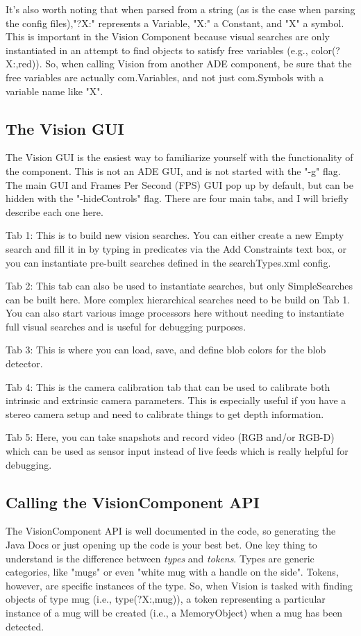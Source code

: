 \documentclass{article}
\begin{document}
It's also worth noting that when parsed from a string (as is the case when parsing
the config files),"?X:" represents a Variable, "X:" a Constant, and "X" a symbol.
This is important in the Vision Component because visual searches are only
instantiated in an attempt to find objects to satisfy free variables
(e.g., color(?X:,red)). So, when calling Vision from another ADE component, 
be sure that the free variables are actually com.Variables, and not just com.Symbols
with a variable name like "X".

\subsection{The Vision GUI}
The Vision GUI is the easiest way to familiarize yourself with the functionality of
the component. This is not an ADE GUI, and is not started with the "-g" flag. The main
GUI and Frames Per Second (FPS) GUI pop up by default, but can be hidden with
the "-hideControls" flag. There are four main tabs, and I will briefly describe each
one here.

Tab 1: This is to build new vision searches. You can either create a new Empty search and
fill it in by typing in predicates via the Add Constraints text box, or you can 
instantiate pre-built searches defined in the searchTypes.xml config.

Tab 2: This tab can also be used to instantiate searches, but only SimpleSearches
can be built here. More complex hierarchical searches need to be build on Tab 1. You
can also start various image processors here without needing to instantiate full
visual searches and is useful for debugging purposes.

Tab 3: This is where you can load, save, and define blob colors for the blob detector.

Tab 4: This is the camera calibration tab that can be used to calibrate both
intrinsic and extrinsic camera parameters. This is especially useful if you have
a stereo camera setup and need to calibrate things to get depth information.

Tab 5: Here, you can take snapshots and record video (RGB and/or RGB-D) which can
be used as sensor input instead of live feeds which is really helpful for debugging.

\subsection{Calling the VisionComponent API}
The VisionComponent API is well documented in the code, so generating the Java Docs
or just opening up the code is your best bet. One key thing to understand
is the difference between {\em types} and {\em tokens}. Types are generic categories, like
"mugs" or even "white mug with a handle on the side". Tokens, however, are specific
instances of the type. So, when Vision is tasked with finding objects of type mug
(i.e., type(?X:,mug)), a token representing a particular instance of a mug
will be created (i.e., a MemoryObject) when a mug has been detected.
\end{document}
